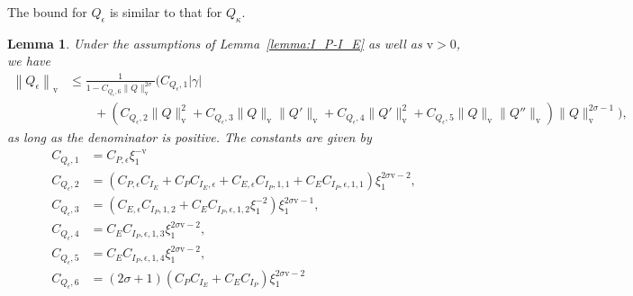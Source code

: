 \documentclass[11pt]{article}
\newcommand{\normv}{\mathrm{v}}
\newtheorem{lemma}[definition]{Lemma}
\begin{document}
The bound for \(Q_{\epsilon}\) is similar to that for \(Q_{\kappa}\).
\begin{lemma}\label{lemma:norm-Q-depsilon}
  Under the assumptions of Lemma~\ref{lemma:I_P-I_E} as well as
  \(\normv > 0\), we have
  \begin{align*}
    \left\|Q_{\epsilon}\right\|_{\normv}
    &\leq \frac{1}{
      1
      - C_{Q_{\epsilon},6}\|Q\|_{\normv}^{2\sigma}
      }\Big(
      C_{Q_{\epsilon},1}|\gamma|\\
    &\qquad+ \left(
      C_{Q_{\epsilon},2}\|Q\|_{\normv}^{2}
      + C_{Q_{\epsilon},3}\|Q\|_{\normv}\|Q'\|_{\normv}
      + C_{Q_{\epsilon},4}\|Q'\|_{\normv}^{2}
      + C_{Q_{\epsilon},5}\|Q\|_{\normv}\|Q''\|_{\normv}
      \right)\|Q\|_{\normv}^{2\sigma - 1}
      \Big),
  \end{align*}
  as long as the denominator is positive. The constants are given by
  \begin{align*}
    C_{Q_{\epsilon},1}
    &= C_{P,\epsilon}\xi_{1}^{-\normv}\\
    C_{Q_{\epsilon},2}
    &= \left(
      C_{P,\epsilon}C_{I_{E}}
    + C_{P}C_{I_{E},\epsilon}
    + C_{E,\epsilon}C_{I_{P},1,1}
    + C_{E}C_{I_{P},\epsilon,1,1}\right)\xi_{1}^{2\sigma\normv - 2},\\
    C_{Q_{\epsilon},3}
    &= (C_{E,\epsilon}C_{I_{P},1,2}
      + C_{E}C_{I_{P},\epsilon,1,2}\xi_{1}^{-2})\xi_{1}^{2\sigma\normv - 1},\\
    C_{Q_{\epsilon},4}
    &= C_{E}C_{I_{P},\epsilon,1,3}\xi_{1}^{2\sigma\normv - 2},\\
    C_{Q_{\epsilon},5}
    &= C_{E}C_{I_{P},\epsilon,1,4}\xi_{1}^{2\sigma\normv - 2},\\
    C_{Q_{\epsilon},6}
    &= (2\sigma + 1)(
      C_{P}C_{I_{E}}
      + C_{E}C_{I_{P}}
      )\xi_{1}^{2\sigma\normv - 2}
  \end{align*}
\end{lemma}
\end{document}

